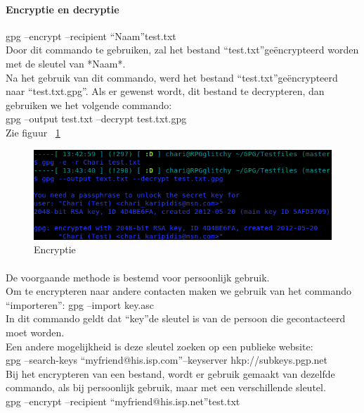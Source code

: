 \documentclass[12pt]{article}
\begin{document}
				\paragraph{Encryptie en decryptie} \cite{GPGstart}
				gpg --encrypt --recipient \textquotedblleft Naam\textquotedblright test.txt\\
				Door dit commando te gebruiken, zal het bestand \textquotedblleft test.txt\textquotedblright ge\"encrypteerd worden
				met de sleutel van *Naam*.\\
				Na het gebruik van dit commando, werd het bestand \textquotedblleft test.txt\textquotedblright ge\"encrypteerd naar
				\textquotedblleft test.txt.gpg\textquotedblright.
				Als er gewenst wordt, dit bestand te decrypteren, dan gebruiken we het volgende 
				commando:\\
				gpg --output test.txt --decrypt test.txt.gpg\\
				Zie figuur ~\ref{Encryptie}\\
				
				\begin{figure}[!ht]
					\begin{center}
						\includegraphics[scale=0.4]{Pictures/Encryptie}
					\end{center}
					\caption{Encryptie}\label{Encryptie}
				\end{figure}
				
				\paragraph{}
				De voorgaande methode is bestemd voor persoonlijk gebruik.\\
				Om te encrypteren naar andere contacten maken we gebruik van het commando 
				\textquotedblleft importeren\textquotedblright: gpg --import key.asc\\
				In dit commando geldt dat \textquotedblleft key\textquotedblright de sleutel is van de persoon die gecontacteerd
				moet worden.\\
				Een andere mogelijkheid is deze sleutel zoeken op een publieke website:\\
				gpg --search-keys \textquotedblleft myfriend@his.isp.com\textquotedblright --keyserver hkp://subkeys.pgp.net\\
				Bij het encrypteren van een bestand, wordt er gebruik gemaakt van dezelfde commando,
				als bij persoonlijk gebruik, maar met een verschillende sleutel.\\
				gpg --encrypt --recipient \textquotedblleft myfriend@his.isp.net\textquotedblright test.txt\\		
				\cite{GPGstart}
			
\end{document}
